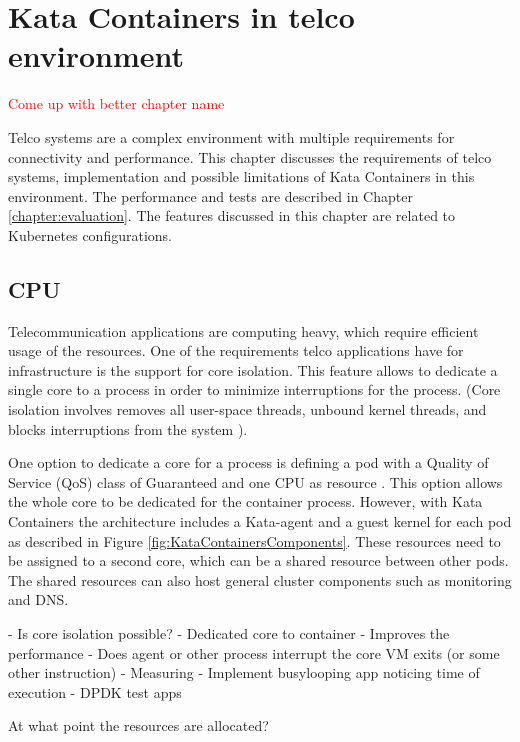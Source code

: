 \chapter{Kata Containers in telco environment}
\label{chapter:implementation}

\textcolor{red}{Come up with better chapter name}

Telco systems are a complex environment with multiple requirements for connectivity and performance. This chapter discusses the requirements of telco systems, implementation and possible limitations of Kata Containers in this environment. The performance and tests are described in Chapter \ref{chapter:evaluation}. The features discussed in this chapter are related to Kubernetes configurations.

\section{CPU}

Telecommunication applications are computing heavy, which require efficient usage of the resources. One of the requirements telco applications have for infrastructure is the support for core isolation. This feature allows to dedicate a single core to a process in order to minimize interruptions for the process. (Core isolation involves removes all user-space threads, unbound kernel threads, and blocks interruptions from the system \cite{CPUisolation}).

One option to dedicate a core for a process is defining a pod with a Quality of Service (QoS) class of Guaranteed and one CPU as resource \cite{QOSKubernetes}. This option allows the whole core to be dedicated for the container process. However, with Kata Containers the architecture includes a Kata-agent and a guest kernel for each pod as described in Figure \ref{fig:KataContainersComponents}. These resources need to be assigned to a second core, which can be a shared resource between other pods. The shared resources can also host general cluster components such as monitoring and DNS.



- Is core isolation possible?
	- Dedicated core to container
		- Improves the performance
	- Does agent or other process interrupt the core VM exits (or some other instruction)
	- Measuring
		- Implement busylooping app noticing time of execution
		- DPDK test apps

At what point the resources are allocated?




